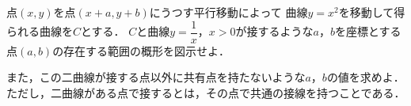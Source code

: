 \documentclass[../../main.tex]{subfiles}
\begin{document}
点$(x,y)$を点$(x+a,y+b)$にうつす平行移動によって
曲線$y=x^2$を移動して得られる曲線を$C$とする．
$C$と曲線$\displaystyle y=\dfrac{1}{x}$，$x>0$が接するような$a$，$b$を座標とする
点$(a,b)$の存在する範囲の概形を図示せよ．

また，この二曲線が接する点以外に共有点を持たないような$a$，$b$の値を求めよ．
ただし，二曲線がある点で接するとは，その点で共通の接線を持つことである．
\end{document}
